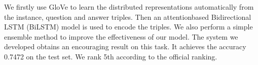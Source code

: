 We firstly use GloVe to learn the distributed representations automatically from the instance, question and answer triples. Then an attentionbased Bidirectional LSTM (BiLSTM) model is used to encode the triples. We also perform a simple ensemble method to improve the effectiveness of our model. The system we developed obtains an encouraging result on this task. It achieves the accuracy 0.7472 on the test set. We rank 5th according to the official ranking.
